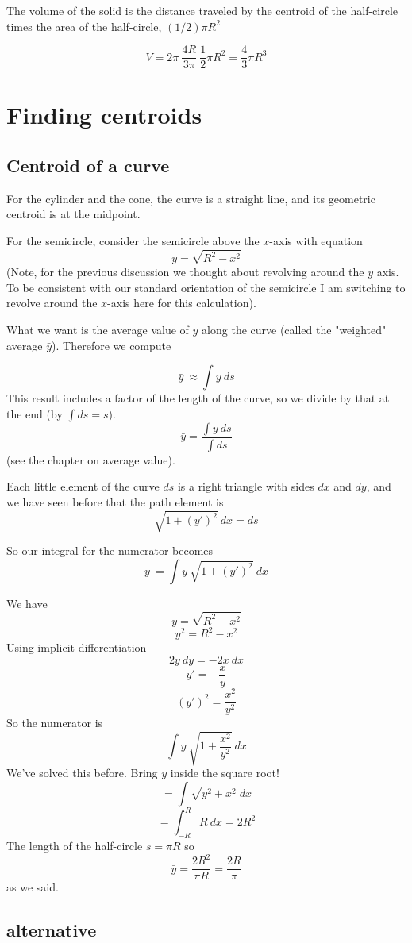 \documentclass[11pt, oneside]{article}   	%
\begin{document}
The volume of the solid is the distance traveled by the centroid of the half-circle times the area of the half-circle, $(1/2) \pi R^2$

\[ V = 2 \pi \ \frac{4 R}{3 \pi} \ \frac{1}{2} \pi R^2 = \frac{4}{3} \pi R^3 \]

\section*{Finding centroids}
\subsection*{Centroid of a curve}

For the cylinder and the cone, the curve is a straight line, and its geometric centroid is at the midpoint.

For the semicircle, consider the semicircle above the $x$-axis with equation
\[ y = \sqrt{R^2 - x^2} \]
(Note, for the previous discussion we thought about revolving around the $y$ axis.  To be consistent with our standard orientation of the semicircle I am switching to revolve around the $x$-axis here for this calculation).

What we want is the average value of $y$ along the curve (called the "weighted" average $\bar{y}$).  Therefore we compute

\[ \bar{y}  \ \approx \int y \ ds \]
This result includes a factor of the length of the curve, so we divide by that at the end (by $\int ds = s$).
\[ \bar{y} = \frac{\int y \ ds}{\int ds} \]
(see the chapter on average value).

Each little element of the curve $ds$ is a right triangle with sides $dx$ and $dy$, and we have seen before that the path element is
\[ \sqrt{1 + (y')^2} \ dx = ds \]

So our integral for the numerator becomes
\[ \bar{y}\ = \int y \ \sqrt{1 + (y')^2} \ dx \]

We have
\[ y = \sqrt{R^2 - x^2} \]
\[ y^2 = R^2 - x^2 \]
Using implicit differentiation
\[ 2y \ dy = - 2x \ dx \]
\[ y' = -\frac{x}{y} \]
\[ (y')^2 = \frac{x^2}{y^2} \]
So the numerator is
\[  \int y \ \sqrt{1 + \frac{x^2}{y^2}} \ dx \]
We've solved this before.  Bring $y$ inside the square root!
\[ = \int \sqrt{y^2 + x^2} \ dx \]
\[  = \int_{-R}^{R} R \ dx = 2R^2 \]
The length of the half-circle $s=\pi R$ so
\[ \bar{y} = \frac{2R^2}{\pi R} = \frac{2R}{\pi} \]
as we said.

\subsection*{alternative}
\end{document}
